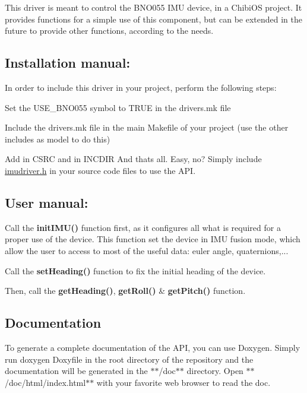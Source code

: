 This driver is meant to control the B\+N\+O055 I\+MU device, in a Chibi\+OS project. It provides functions for a simple use of this component, but can be extended in the future to provide other functions, according to the needs.

\subsection*{Installation manual\+:}

In order to include this driver in your project, perform the following steps\+:
\begin{DoxyItemize}
\item Set the U\+S\+E\+\_\+\+B\+N\+O055 symbol to T\+R\+UE in the drivers.\+mk file
\item Include the drivers.\+mk file in the main Makefile of your project (use the other includes as model to do this)
\item Add  in C\+S\+RC and  in I\+N\+C\+D\+IR And that\textquotesingle{}s all. Easy, no? Simply include \hyperlink{imudriver_8h_source}{imudriver.\+h} in your source code files to use the A\+PI.
\end{DoxyItemize}

\subsection*{User manual\+:}


\begin{DoxyItemize}
\item Call the {\bfseries init\+I\+M\+U()} function first, as it configures all what is required for a proper use of the device. This function set the device in I\+MU fusion mode, which allow the user to access to most of the useful data\+: euler angle, quaternions,...
\item Call the {\bfseries set\+Heading()} function to fix the initial heading of the device.
\item Then, call the {\bfseries get\+Heading()}, {\bfseries get\+Roll()} \& {\bfseries get\+Pitch()} function.
\end{DoxyItemize}

\subsection*{Documentation}

To generate a complete documentation of the A\+PI, you can use Doxygen. Simply run {\ttfamily doxygen Doxyfile} in the root directory of the repository and the documentation will be generated in the $\ast$$\ast$/doc$\ast$$\ast$ directory. Open $\ast$$\ast$/doc/html/index.html$\ast$$\ast$ with your favorite web browser to read the doc.

